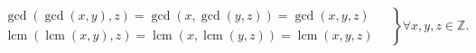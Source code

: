 \documentclass[12pt]{article}
\begin{document}
$$
\left .{\begin{matrix}{\operatorname  {gcd}}({\operatorname  {gcd}}(x,y),z)={\operatorname  {gcd}}(x,{\operatorname  {gcd}}(y,z))={\operatorname  {gcd}}(x,y,z)\ \quad \\{\operatorname  {lcm}}({\operatorname  {lcm}}(x,y),z)={\operatorname  {lcm}}(x,{\operatorname  {lcm}}(y,z))={\operatorname  {lcm}}(x,y,z)\quad \end{matrix}}\right \}\forall x,y,z\in {\mathbb  {Z}}.
$$
\end{document}
